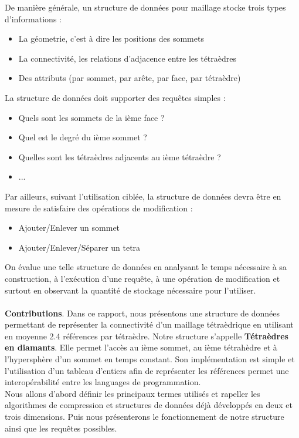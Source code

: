 \documentclass[a4paper,11pt,openany]{article}
\begin{document}
De manière générale, un structure de données pour maillage stocke trois types d'informations :
\begin{itemize}
\item La géometrie, c'est à dire les positions des sommets
\item La connectivité, les relations d'adjacence entre les tétraèdres
\item Des attributs (par sommet, par arête, par face, par tétraèdre)
\end{itemize}
La structure de données doit supporter des requêtes simples :
\begin{itemize}
\item Quels sont les sommets de la ième face ?
\item Quel est le degré du ième sommet ?
\item Quelles sont les tétraèdres adjacents au ième tétraèdre ?
\item ...
\end{itemize}
Par ailleurs, suivant l'utilisation ciblée, la structure de données devra être en mesure de satisfaire des opérations de modification :
\begin{itemize}
\item Ajouter/Enlever un sommet
\item Ajouter/Enlever/Séparer un tetra\\
\end{itemize}
On évalue une telle structure de données en analysant le temps nécessaire à sa construction, à l'exécution d'une requête, à une opération de modification et surtout en observant la quantité de stockage nécessaire pour l'utiliser.\\\\
\textbf{Contributions}. Dans ce rapport, nous présentons une structure de données permettant de représenter la connectivité d'un maillage tétraèdrique en utilisant en moyenne 2.4 références par tétraèdre. Notre structure s'appelle \textbf{Tétraèdres en diamants}. Elle permet l'accès au ième sommet, au ième tétrahèdre et à l'hypersphère d'un sommet en temps constant. Son implémentation est simple et l'utilisation d'un tableau d'entiers afin de représenter les références permet une interopérabilité entre les languages de programmation.\\
Nous allons d'abord définir les principaux termes utilisés et rapeller les algorithmes de compression et structures de données déjà développés en deux et trois dimensions. Puis nous présenterons le fonctionnement de notre structure ainsi que les requêtes possibles.
\end{document}
